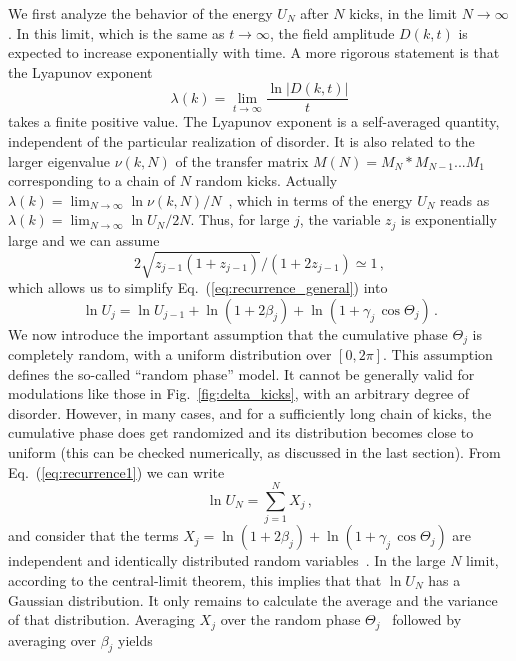 \documentclass[ prl, twocolumn, superscriptaddress, amsfonts, amsmath,floatfix]{revtex4-1}
\begin{document}
We first analyze the behavior of the energy $U_N$ after $N$ kicks, in the limit $N \to \infty$. {In this limit, which is the same as $t\to\infty$, the field amplitude $D(k,t)$ is expected to increase exponentially with time. A more rigorous statement is that the Lyapunov exponent
\begin{equation}
\lambda(k)=\lim_{t\to\infty} \frac{\ln |D(k,t)|}{t}
\label{eq:Lyapunov}
\end{equation}
takes a finite positive value. The Lyapunov exponent is a self-averaged quantity, independent of the particular realization of disorder.}
It is also related to the larger eigenvalue $\nu(k,N)$ of the transfer matrix $M(N)=M_N*M_{N-1}...M_1$ corresponding to a chain of $N$ random kicks. Actually $\lambda(k) = \lim_{N\to\infty}\ln\nu(k,N)/N$~\cite{Comtet2013}, which in terms of the energy $U_N$ reads as $\lambda(k) = \lim_{N\to\infty}\ln U_N/2N$. Thus, for large $j$, the variable $z_j$ is exponentially large and we can assume
\begin{equation}
2\sqrt{z_{j-1}(1+z_{j-1})}/(1+2z_{j-1}) \simeq 1 \, ,
\label{eq:condition2}
\end{equation}
which allows us to simplify Eq.~(\ref{eq:recurrence_general}) into
\begin{equation}
\ln U_j = \ln U_{j-1} + \ln(1+2\beta_j) + \ln \left (1 + \gamma_j \,  \cos \Theta_j \right ) \, .
\label{eq:recurrence1}
\end{equation}
We now introduce the important assumption that the cumulative phase $\Theta_j$ is completely random, with a uniform distribution over $[0,2\pi]$. This assumption defines the so-called ``random phase'' model. It cannot be generally valid for modulations like those in Fig.~\ref{fig:delta_kicks}, with an arbitrary degree of disorder. However, in many cases, and for a sufficiently long chain of kicks, the cumulative phase does get randomized and its distribution becomes close to uniform (this can be checked numerically, as discussed in the last section). From Eq.~(\ref{eq:recurrence1}) we can write
\begin{equation}
\ln U_N = \sum_{j=1}^N X_j \, ,
\label{eq:sum_UN}
\end{equation}
and consider that the terms $X_j = \ln(1+2\beta_j) + \ln \left (1 + \gamma_j \,  \cos \Theta_j \right )$ are independent  and identically distributed random variables~\cite{note_sum}. In the large $N$ limit, according to the central-limit theorem, this implies that that $\ln U_N$ has a Gaussian distribution. It only remains to calculate the average and the variance of that distribution. Averaging $X_j$ over the random phase $\Theta_j$~{\cite{note_average}} followed by averaging over $\beta_j$ yields
\end{document}
